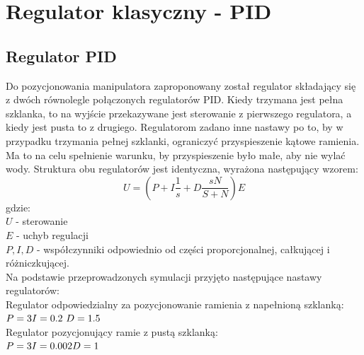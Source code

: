 \chapter{Regulator klasyczny - PID}
\label{cha:regulator}

\section{Regulator PID}
Do pozycjonowania manipulatora zaproponowany został regulator składający się z dwóch równolegle połączonych regulatorów PID. Kiedy trzymana jest pełna szklanka, to na wyjście przekazywane jest sterowanie z pierwszego regulatora, a kiedy jest pusta to z drugiego. Regulatorom zadano inne nastawy po to, by w przypadku trzymania pełnej szklanki, ograniczyć przyspieszenie kątowe ramienia. Ma to na celu spełnienie warunku, by przyspieszenie było małe, aby nie wylać wody. Struktura obu regulatorów jest identyczna, wyrażona następujący wzorem:
\begin{equation}\label{key}
U = (P + I \frac{1}{s} + D\frac{sN}{S+N}) E
\end{equation}
gdzie:\\
$
U$ - sterowanie\\
$E$ - uchyb regulacji\\
$P, I, D$ - współczynniki odpowiednio od części proporcjonalnej, całkującej i różniczkującej.\\
\newline
Na podstawie przeprowadzonych symulacji przyjęto następujące nastawy regulatorów:\\
Regulator odpowiedzialny za pozycjonowanie ramienia z napełnioną szklanką:\\
$
P = 3\\
I = 0.2\\\
D = 1.5\\
$\\
Regulator pozycjonujący ramie z pustą szklanką:\\
$
P = 3\\
I = 0.002\\
D = 1\\
$

